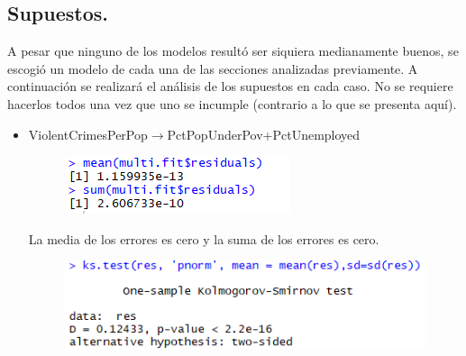 \documentclass[a4paper,10pt,twocolumn]{article}
\begin{document}
\subsection*{Supuestos.}

	A pesar que ninguno de los modelos resultó ser siquiera medianamente buenos, se escogió un modelo de cada una de las secciones analizadas previamente. A continuación se realizará el análisis de los supuestos en cada caso. No se requiere hacerlos todos una vez que uno se incumple (contrario a lo que se presenta aquí).

	\begin{itemize}
		\item {ViolentCrimesPerPop$\rightarrow$PctPopUnderPov+PctUnemployed}
		
			\begin{figure}[H]
				\begin{center}
					\includegraphics[width=.92\columnwidth,right]{figures/sup1.png}
				\end{center}
			\end{figure}

			La media de los errores es cero y la suma de los errores es cero.





			\begin{figure}[H]
				\begin{center}
					\includegraphics[width=.92\columnwidth,right]{figures/sup2.png}
				\end{center}
			\end{figure}
			

\end{itemize}
\end{document}
